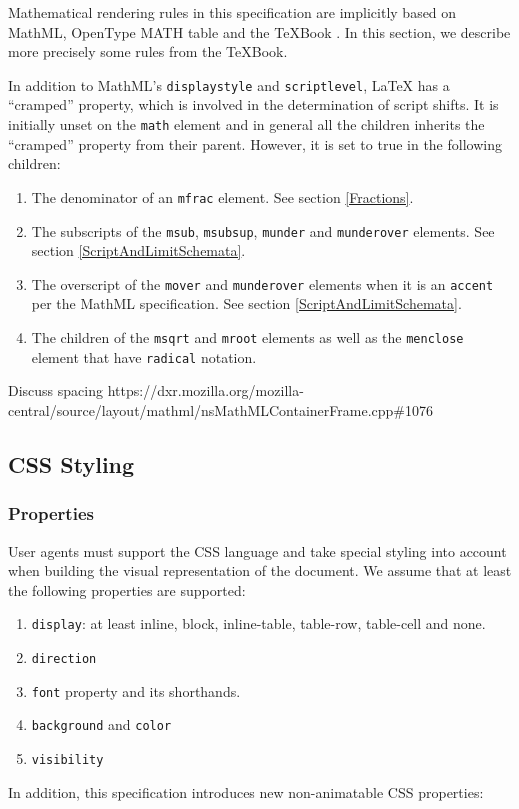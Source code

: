 Mathematical rendering rules in this specification are implicitly based on
MathML, OpenType MATH table and the TeXBook
\cite{MathML3} \cite{OpenFontFormat3} \cite{TeXBook}. In this section, we
describe more precisely some rules from the TeXBook.

In addition to MathML's {\tt displaystyle} and {\tt scriptlevel}, LaTeX has
a ``cramped'' property, which is involved in the determination of script shifts.
It is initially unset on the {\tt math} element and in general
all the children inherits the ``cramped'' property from their parent.
However, it is set to true in the following children:

\begin{enumerate}
\item The denominator of an {\tt mfrac} element. See section \ref{Fractions}.
\item The subscripts of the {\tt msub}, {\tt msubsup},
  {\tt munder} and {\tt munderover} elements.
  See section \ref{ScriptAndLimitSchemata}.
\item The overscript of the
  {\tt mover} and {\tt munderover} elements when it is an {\tt accent} per
  the MathML specification. See section \ref{ScriptAndLimitSchemata}.
\item The children of the {\tt msqrt} and {\tt mroot}
  elements as well as the {\tt menclose} element that have {\tt radical}
  notation.
\end{enumerate}

Discuss spacing https://dxr.mozilla.org/mozilla-central/source/layout/mathml/nsMathMLContainerFrame.cpp\#1076 

\subsection{CSS Styling}

\subsubsection{Properties}

User agents must support the CSS language \cite{CSS2} and take special styling
into account when building the visual representation of the document.
We assume that at least the following properties are supported:
%
\begin{enumerate}
\item {\tt display}: at least inline, block, inline-table, table-row,
  table-cell and none.
\item {\tt direction}
\item {\tt font} property and its shorthands.
\item {\tt background} and {\tt color}
\item {\tt visibility}
\end{enumerate}
%
In addition, this specification introduces new non-animatable CSS properties:

